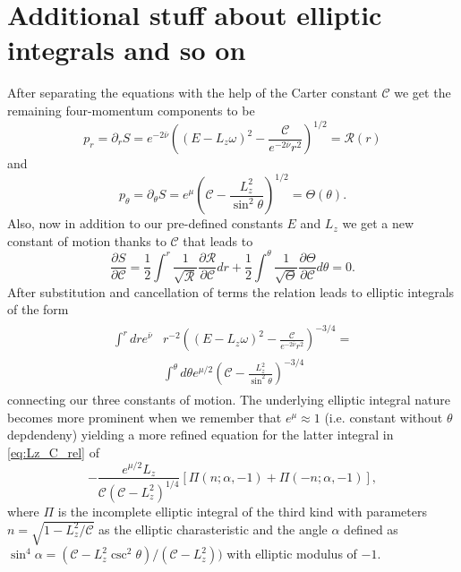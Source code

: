 \documentclass[iop, usenatbib]{emulateapj}
\newcommand{\be}{\begin{equation}}
\newcommand{\ee}{\end{equation}}
\newcommand{\pd}{\ensuremath{\partial}} %
\newcommand{\Ca}{\ensuremath{\mathcal{C}}}
\newcommand{\nub}{\ensuremath{\bar{\nu}}}
\begin{document}





\clearpage
\appendix

\section{Additional stuff about elliptic integrals and so on}

After separating the equations with the help of the Carter constant $\Ca$ we get the remaining four-momentum components to be
\be\label{eq:pr}
p_r = \pd_r S = e^{-2\nub} \left( (E-L_z \omega)^2 - \frac{\mathcal{C}}{e^{-2\nub} r^2} \right)^{1/2} = \mathcal{R}(r)
\ee
and
\be\label{eq:ptheta}
p_{\theta} = \pd_{\theta} S = e^{\mu} \left( \mathcal{C} - \frac{L_z^2}{\sin^2 \theta} \right)^{1/2} = \Theta(\theta).
\ee
Also, now in addition to our pre-defined constants $E$ and $L_z$ we get a new constant of motion thanks to $\mathcal{C}$ that leads to
\be
\frac{\pd S}{\pd \mathcal{C}} = \frac{1}{2} \int^r \frac{1}{\sqrt{\mathcal{R}}} \frac{\pd \mathcal{R}}{\pd \mathcal{C}} dr + \frac{1}{2} \int^{\theta} \frac{1}{\sqrt{\Theta}} \frac{\pd \Theta}{\pd \mathcal{C}} d\theta = 0.
\ee 
After substitution and cancellation of terms the relation leads to elliptic integrals of the form
\begin{align}\begin{split}\label{eq:Lz_C_rel}
 \int^r dr e^{\nub} & r^{-2} \left( (E-L_z\omega)^2 - \frac{\mathcal{C}}{e^{-2\nub} r^2} \right)^{-3/4}  = \\
& \int^{\theta} d\theta e^{\mu/2} \left(\mathcal{C} - \frac{L_z^2}{\sin^2 \theta} \right)^{-3/4}
\end{split}\end{align}
connecting our three constants of motion.
The underlying elliptic integral nature becomes more prominent when we remember that $e^{\mu} \approx 1$ (i.e. constant without $\theta$ depdendeny) yielding a more refined equation for the latter integral in \eqref{eq:Lz_C_rel} of
\be
-\frac{e^{\mu/2} L_z}{\mathcal{C} (\mathcal{C}-L_z^2)^{1/4}} [ \Pi(n; \alpha, -1)+\Pi(-n;\alpha, -1)],
\ee
where $\Pi$ is the incomplete elliptic integral of the third kind with parameters $n = \sqrt{1-L_z^2/\mathcal{C}}$ as the elliptic charasteristic and the angle $\alpha$ defined as $\sin^4 \alpha = (\mathcal{C}-L_z^2 \csc^2 \theta)/(\mathcal{C}-L_z^2))$ with elliptic modulus of $-1$.
\end{document}
